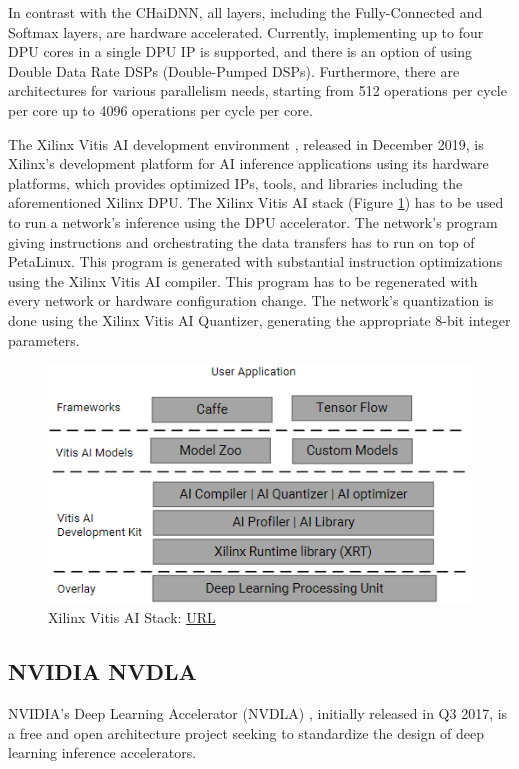 In contrast with the CHaiDNN, all layers, including the Fully-Connected and Softmax layers, are hardware accelerated. Currently, implementing up to four DPU cores in a single DPU IP is supported, and there is an option of using Double Data Rate DSPs (Double-Pumped DSPs). Furthermore, there are architectures for various parallelism needs, starting from 512 operations per cycle per core up to 4096 operations per cycle per core.

The Xilinx Vitis AI development environment \cite{Xilinx-Vitis-AI}, released in December 2019, is Xilinx's development platform for AI inference applications using its hardware platforms, which provides optimized IPs, tools, and libraries including the aforementioned Xilinx DPU. The Xilinx Vitis AI stack (Figure \ref{fig:vitis-ai-stack}) has to be used to run a network's inference using the DPU accelerator. The network's program giving instructions and orchestrating the data transfers has to run on top of PetaLinux. This program is generated with substantial instruction optimizations using the Xilinx Vitis AI compiler. This program has to be regenerated with every network or hardware configuration change. The network's quantization is done using the Xilinx Vitis AI Quantizer, generating the appropriate 8-bit integer parameters.

\begin{figure} [H]
	\centering
	\includegraphics[scale=0.6]{Images/Hardware/vitis-ai-stack.png}
	\decoRule
	\caption[Xilinx Vitis AI Stack]{Xilinx Vitis AI Stack: \href{https://www.xilinx.com/support/documentation/ip_documentation/dpu/v3_2/pg338-dpu.pdf}{URL}}
	\label{fig:vitis-ai-stack}
\end{figure}

\subsection{NVIDIA NVDLA}
NVIDIA's Deep Learning Accelerator (NVDLA) \cite{NVIDIA-NVDLA}, initially released in Q3 2017, is a free and open architecture project seeking to standardize the design of deep learning inference accelerators.

